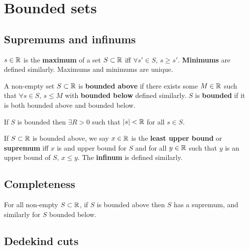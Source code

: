 \documentclass[../Year1.tex]{subfiles}
\begin{document}
\section{Bounded sets}

\subsection{Supremums and infinums}
\begin{definition}
    $s\in\mathbb{R}$ is the \textbf{maximum} of a set $S\subset\mathbb{R}$ iff $\forall s'\in S$, $s\geq s'$. \textbf{Minimums} are defined similarly. Maximums and minimums are unique.
\end{definition}

\begin{definition}[Bounded]
    A non-empty set $S\subset\mathbb{R}$ is \textbf{bounded above} if there exists some $M\in\mathbb{R}$ such that $\forall s\in S$, $s\leq M$ with \textbf{bounded below} defined similarly. $S$ is \textbf{bounded} if it is both bounded above and bounded below.
\end{definition}

\begin{theorem}
    If $S$ is bounded then $\exists R>0$ such that $|s|<\mathbb{R}$ for all $s\in S$.
\end{theorem}

\begin{definition}
    If $S\subset\mathbb{R}$ is bounded above, we say $x\in\mathbb{R}$ is the \textbf{least upper bound} or \textbf{supremum} iff $x$ is and upper bound for $S$ and for all $y\in\mathbb{R}$ such that $y$ is an upper bound of $S$, $x\leq y$. The \textbf{infinum} is defined similarly.
\end{definition}

\subsection{Completeness}

\begin{theorem}
    For all non-empty $S\subset\mathbb{R}$, if $S$ is bounded above then $S$ has a supremum, and similarly for $S$ bounded below.
\end{theorem}

\subsection{Dedekind cuts}
\end{document}
